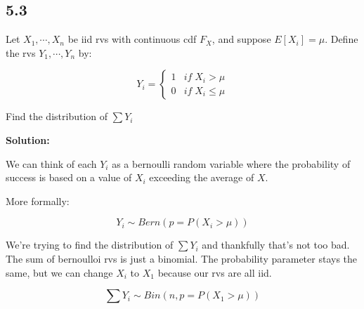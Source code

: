 \subsection*{5.3}

Let $X_1, \cdots, X_n$ be iid rvs with continuous cdf $F_X$, and suppose $E[X_i] = \mu$. Define the rvs $Y_1, \cdots, Y_n$ by:

\[
Y_i =
\begin{cases}
	1 & if \; X_i > \mu \\
	0 & if \; X_i \leq \mu
\end{cases}
\]

Find the distribution of $\sum Y_i$

\noindent \textbf{Solution:}

We can think of each $Y_i$ as a bernoulli random variable where the probability of success is based on a value of $X_i$ exceeding the average of $X$.

More formally:

\[Y_i \sim Bern(p=P(X_i > \mu))\]

We're trying to find the distribution of $\sum Y_i$ and thankfully that's not too bad. The sum of bernoulloi rvs is just a binomial. The probability parameter stays the same, but we can change $X_i$ to $X_1$ because our rvs are all iid. 

\[\sum Y_i \sim Bin(n, p=P(X_1 > \mu))\]

